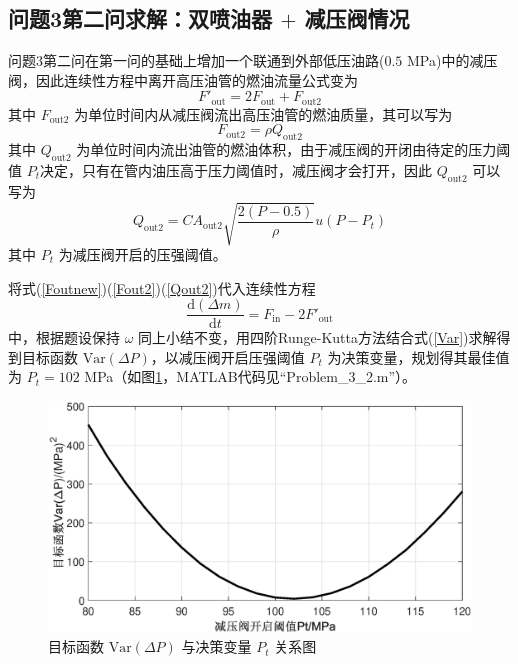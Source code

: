 \documentclass[12pt,a4paper]{article}
\begin{document}
\subsection{问题3第二问求解：双喷油器 $+$ 减压阀情况}
问题3第二问在第一问的基础上增加一个联通到外部低压油路($0.5$ MPa)中的减压阀，因此连续性方程中离开高压油管的燃油流量公式变为
\begin{equation}
\label{Foutnew}
F'_{\text{out}}=2F_{\text{out}}+F_{\text{out}2}
\end{equation}
其中 $F_{\text{out}2}$ 为单位时间内从减压阀流出高压油管的燃油质量，其可以写为
\begin{equation}
\label{Fout2}
F_{\text{out}2}=\rho Q_{\text{out}2}
\end{equation}
其中 $Q_{\text{out}2}$ 为单位时间内流出油管的燃油体积，由于减压阀的开闭由待定的压力阈值 $P_{t}$决定，只有在管内油压高于压力阈值时，减压阀才会打开，因此 $Q_{\text{out}2}$ 可以写为
\begin{equation}
\label{Qout2}
Q_{\text{out}2}=CA_{\text{out}2}\sqrt{\frac{2(P-0.5)}{\rho}}u(P-P_t)
\end{equation}
其中 $P_t$ 为减压阀开启的压强阈值。

将式(\ref{Foutnew})(\ref{Fout2})(\ref{Qout2})代入连续性方程
\begin{equation}
\frac{\text{d}(\Delta m)}{\text{d}t}=F_{\text{in}}-2F'_{\text{out}}
\end{equation}
中，根据题设保持 $\omega$ 同上小结不变，用四阶Runge-Kutta方法结合式(\ref{Var})求解得到目标函数 $\text{Var}(\Delta P)$，以减压阀开启压强阈值 $P_t$ 为决策变量，规划得其最佳值为 $P_t=102$ MPa（如图\ref{Problem_3_2}，MATLAB代码见“Problem\_3\_2.m”）。
\begin{figure}[h]
\centering
\includegraphics[scale=0.5]{Problem_3_2.eps}
\caption{目标函数 $\text{Var}(\Delta P)$ 与决策变量 $P_t$ 关系图}\label{Problem_3_2}
\end{figure}
\end{document}
